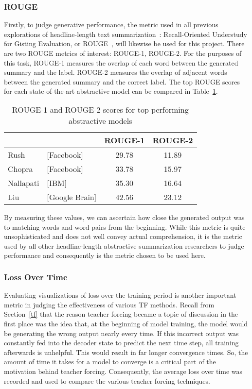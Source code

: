\subsubsection{ROUGE}\label{method:rouge}
Firstly, to judge generative performance, the metric used in all previous explorations of headline-length text summarization~\cite{Rush2015,Chopra2016,Nallapati2016a,Liu2016,See2017}: Recall-Oriented Understudy for Gisting Evaluation, or ROUGE~\cite{Lin2004}, will likewise be used for this project. There are two ROUGE metrics of interest: ROUGE-1, ROUGE-2. For the purposes of this task, ROUGE-1 measures the overlap of each word between the generated summary and the label. ROUGE-2 measures the overlap of adjacent words between the generated summary and the correct label. The top ROUGE scores for each state-of-the-art abstractive model can be compared in Table~\ref{tab:rouge}.
\begin{table}[h]
  \begin{center}
    \begin{tabular}{ | l l | c | c | }
      \hline
      & & ROUGE-1 & ROUGE-2 \\
      \hline
      Rush & [Facebook] & 29.78 & 11.89 \\
      Chopra & [Facebook] & 33.78 & 15.97 \\
      Nallapati & [IBM] & 35.30 & 16.64 \\
      Liu & [Google Brain] & 42.56 & 23.12 \\
      \hline
    \end{tabular}
    \caption{ROUGE-1 and ROUGE-2 scores for top performing abstractive models}
    \label{tab:rouge}
  \end{center}
\end{table}
By measuring these values, we can ascertain how close the generated output was to matching words and word pairs from the beginning. While this metric is quite unsophisticated and does not well convey actual comprehension, it is the metric used by all other headline-length abstractive summarization researchers to judge performance and consequently is the metric chosen to be used here.

\subsubsection{Loss Over Time}
Evaluating visualizations of loss over the training period is another important metric in judging the effectiveness of various TF methods. Recall from Section~\ref{tf} that the reason teacher forcing became a topic of discussion in the first place was the idea that, at the beginning of model training, the model would be generating the wrong output nearly every time. If this incorrect output was constantly fed into the decoder state to predict the next time step, all training afterwards is unhelpful. This would result in far longer convergence times. So, the amount of time it takes for a model to converge is a critical part of the motivation behind teacher forcing. Consequently, the average loss over time was recorded and used to compare the various teacher forcing techniques.

